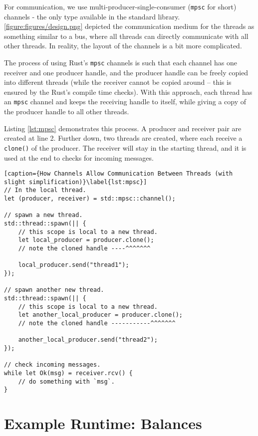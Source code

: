 For communication, we use multi-producer-single-consumer\cite{StdSyncMpsc} (\texttt{mpsc} for short)
channels - the only type available in the standard library. \ref{figure:figures/design.png} depicted
the communication medium for the threads as something similar to a bus, where all threads can
directly communicate with all other threads. In reality, the layout of the channels is a bit more
complicated.

The process of using Rust's \texttt{mpsc} channels is such that each channel has one receiver and
one producer handle, and the producer handle can be freely copied into different threads (while the
receiver cannot be copied around -- this is ensured by the Rust's compile time checks). With this
approach, each thread has an \texttt{mpsc} channel and keeps the receiving handle to itself, while
giving a copy of the producer handle to all other threads.

Listing \ref{lst:mpsc} demonstrates this process. A producer and receiver pair are created at line
2. Further down, two threads are created, where each receive a \texttt{clone()} of the producer. The
receiver will stay in the starting thread, and it is used at the end to checks for incoming
messages.

\begin{lstlisting}[caption={How Channels Allow Communication Between Threads (with slight simplification)}\label{lst:mpsc}]
// In the local thread.
let (producer, receiver) = std::mpsc::channel();

// spawn a new thread.
std::thread::spawn(|| {
	// this scope is local to a new thread.
	let local_producer = producer.clone();
	// note the cloned handle ----^^^^^^^

	local_producer.send("thread1");
});

// spawn another new thread.
std::thread::spawn(|| {
	// this scope is local to a new thread.
	let another_local_producer = producer.clone();
	// note the cloned handle -----------^^^^^^^

	another_local_producer.send("thread2");
});

// check incoming messages.
while let Ok(msg) = receiver.rcv() {
	// do something with `msg`.
}
\end{lstlisting}

\section{Example Runtime: Balances} \label{chap_impl:sec:balances}

